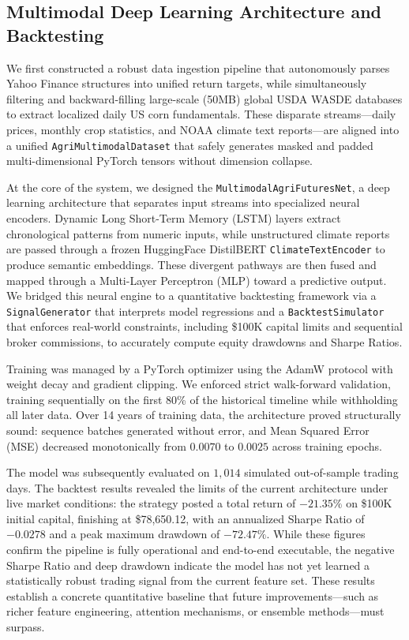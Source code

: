 \documentclass{article} %
\begin{document}
\subsection{Multimodal Deep Learning Architecture and Backtesting}
We first constructed a robust data ingestion pipeline that autonomously parses Yahoo Finance structures into unified return targets, while simultaneously filtering and backward-filling large-scale (50MB) global USDA WASDE databases to extract localized daily US corn fundamentals. These disparate streams—daily prices, monthly crop statistics, and NOAA climate text reports—are aligned into a unified \texttt{AgriMultimodalDataset} that safely generates masked and padded multi-dimensional PyTorch tensors without dimension collapse.

At the core of the system, we designed the \texttt{MultimodalAgriFuturesNet}, a deep learning architecture that separates input streams into specialized neural encoders. Dynamic Long Short-Term Memory (LSTM) layers extract chronological patterns from numeric inputs, while unstructured climate reports are passed through a frozen HuggingFace DistilBERT \texttt{ClimateTextEncoder} to produce semantic embeddings. These divergent pathways are then fused and mapped through a Multi-Layer Perceptron (MLP) toward a predictive output. We bridged this neural engine to a quantitative backtesting framework via a \texttt{SignalGenerator} that interprets model regressions and a \texttt{BacktestSimulator} that enforces real-world constraints, including \$100K capital limits and sequential broker commissions, to accurately compute equity drawdowns and Sharpe Ratios.

Training was managed by a PyTorch optimizer using the AdamW protocol with weight decay and gradient clipping. We enforced strict walk-forward validation, training sequentially on the first 80\% of the historical timeline while withholding all later data. Over 14 years of training data, the architecture proved structurally sound: sequence batches generated without error, and Mean Squared Error (MSE) decreased monotonically from $0.0070$ to $0.0025$ across training epochs.

The model was subsequently evaluated on $1{,}014$ simulated out-of-sample trading days. The backtest results revealed the limits of the current architecture under live market conditions: the strategy posted a total return of $-21.35\%$ on \$100K initial capital, finishing at \$78,650.12, with an annualized Sharpe Ratio of $-0.0278$ and a peak maximum drawdown of $-72.47\%$. While these figures confirm the pipeline is fully operational and end-to-end executable, the negative Sharpe Ratio and deep drawdown indicate the model has not yet learned a statistically robust trading signal from the current feature set. These results establish a concrete quantitative baseline that future improvements—such as richer feature engineering, attention mechanisms, or ensemble methods—must surpass.
\end{document}

